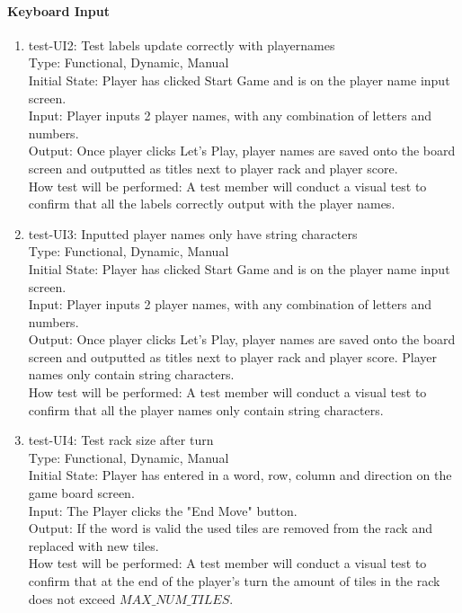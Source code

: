 \documentclass[12pt, titlepage]{article}
\begin{document}
\paragraph{Keyboard Input}
\begin{enumerate}
    \item{test-UI2: Test labels update correctly with playernames\\} %
    Type: Functional, Dynamic, Manual\\
    Initial State: Player has clicked Start Game and is on the player name input screen.\\
    Input: Player inputs 2 player names, with any combination of letters and numbers.\\
    Output: Once player clicks Let's Play, player names are saved onto the board screen and outputted as titles next to player rack and player score.\\
    How test will be performed: A test member will conduct a visual test to confirm that all the labels correctly output with the player names.\\
    
    \item{test-UI3: Inputted player names only have string characters\\} %
    Type: Functional, Dynamic, Manual\\
    Initial State: Player has clicked Start Game and is on the player name input screen.\\
    Input: Player inputs 2 player names, with any combination of letters and numbers.\\
    Output: Once player clicks Let's Play, player names are saved onto the board screen and outputted as titles next to player rack and player score. Player names only contain string characters.\\
    How test will be performed: A test member will conduct a visual test to confirm that all the player names only contain string characters.\\
    
    \item{test-UI4: Test rack size after turn\\} %
    Type: Functional, Dynamic, Manual\\
    Initial State: Player has entered in a word, row, column and direction on the game board screen.\\
    Input: The Player clicks the "End Move" button.\\
    Output: If the word is valid the used tiles are removed from the rack and replaced with new tiles.\\
    How test will be performed: A test member will conduct a visual test to confirm that at the end of the player's turn the amount of tiles in the rack does not exceed $MAX\_NUM\_TILES$.
    

\end{enumerate}
\end{document}
